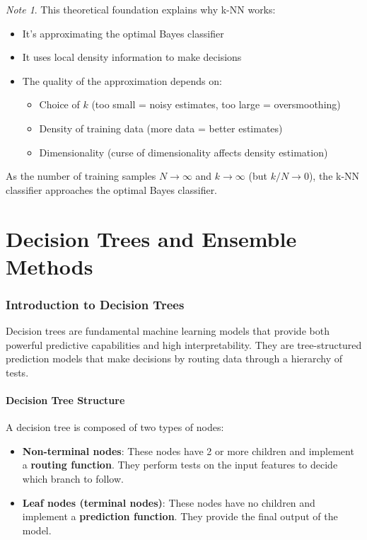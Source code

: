 \documentclass[11pt,a4paper]{article}
\theoremstyle{definition}
\theoremstyle{plain}
\theoremstyle{remark}
\newtheorem*{remark}{Note}
\begin{document}
\begin{remark}
This theoretical foundation explains why k-NN works:
\begin{itemize}
    \item It's approximating the optimal Bayes classifier
    \item It uses local density information to make decisions
    \item The quality of the approximation depends on:
    \begin{itemize}
        \item Choice of $k$ (too small = noisy estimates, too large = oversmoothing)
        \item Density of training data (more data = better estimates)
        \item Dimensionality (curse of dimensionality affects density estimation)
    \end{itemize}
\end{itemize}

As the number of training samples $N \to \infty$ and $k \to \infty$ (but $k/N \to 0$), the k-NN classifier approaches the optimal Bayes classifier.
\end{remark}


\newpage

\part{Decision Trees and Ensemble Methods}
\section{Introduction to Decision Trees}

Decision trees are fundamental machine learning models that provide both powerful predictive capabilities and high interpretability. They are tree-structured prediction models that make decisions by routing data through a hierarchy of tests.

\subsection{Decision Tree Structure}

A decision tree is composed of two types of nodes:

\begin{itemize}
    \item \textbf{Non-terminal nodes}: These nodes have 2 or more children and implement a \textbf{routing function}. They perform tests on the input features to decide which branch to follow.
    
    \item \textbf{Leaf nodes (terminal nodes)}: These nodes have no children and implement a \textbf{prediction function}. They provide the final output of the model.
\end{itemize}
\end{document}
